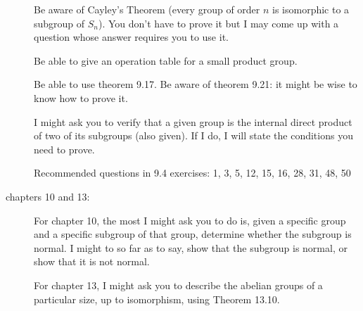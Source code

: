 \documentclass[12pt]{article}
\begin{document}
\begin{description}
Be aware of Cayley's Theorem (every group of order $n$ is isomorphic to a subgroup of $S_n$).  You don't have to prove it but I may come up with a question whose answer requires you to use it.

Be able to give an operation table for a small product group.

Be able to use theorem 9.17.  Be aware of theorem 9.21:  it might be wise to know how to prove it.

I might ask you to verify that a given group is the internal direct product of two of its subgroups (also given).  If I do, I will state the conditions you need to prove.

Recommended questions in 9.4 exercises:  1, 3, 5, 12, 15, 16, 28, 31, 48, 50

\item[chapters 10 and 13:]

For chapter 10, the most I might ask you to do is, given a specific group and a specific subgroup of that group, determine
whether the subgroup is normal.  I might to so far as to say, show that the subgroup is normal, or show that it is not normal.

For chapter 13, I might ask you to describe the abelian groups of a particular size, up to isomorphism, using Theorem 13.10.


\end{description}
\end{document}
